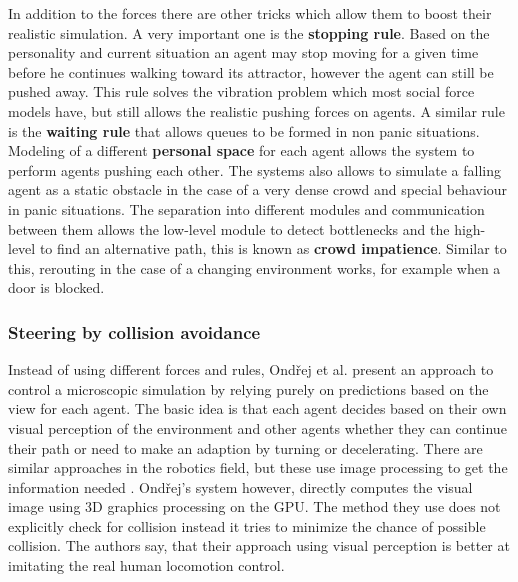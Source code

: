 \documentclass{acmsiggraph}               %
\begin{document}
In addition to the forces there are other tricks which allow them to boost their realistic simulation. 
A very important one is the \textbf{stopping rule}. Based on the personality and current situation an agent may stop moving for a given time before he continues walking toward its attractor, however the agent can still be pushed away. This rule solves the vibration problem which most social force models have, but still allows the realistic pushing forces on agents. 
A similar rule is the \textbf{waiting rule} that allows queues to be formed in non panic situations. Modeling of a different \textbf{personal space} for each agent allows the system to perform agents pushing each other. 
The systems also allows to simulate a falling agent as a static obstacle in the case of a very dense crowd and special behaviour in panic situations. 
The separation into different modules and communication between them allows the low-level module to detect bottlenecks and the high-level to find an alternative path, this is known as \textbf{crowd impatience}. Similar to this, rerouting in the case of a changing environment works, for example when a door is blocked.

\subsubsection{Steering by collision avoidance}

Instead of using different forces and rules, Ondřej et al.  present an approach to control a microscopic simulation by relying purely on predictions based on the view for each agent.
The basic idea is that each agent decides based on their own visual perception of the environment and other agents whether they can continue their path or need to make an adaption by turning or decelerating. There are similar approaches in the robotics field, but these use image processing to get the information needed \cite{chaumette_visual_2006}. Ondřej's system however, directly computes the visual image using 3D graphics processing on the GPU.
The method they use does not explicitly check for collision instead it tries to minimize the chance of possible collision. The authors say, that their approach using visual perception is better at imitating the real human locomotion control.
\end{document}
